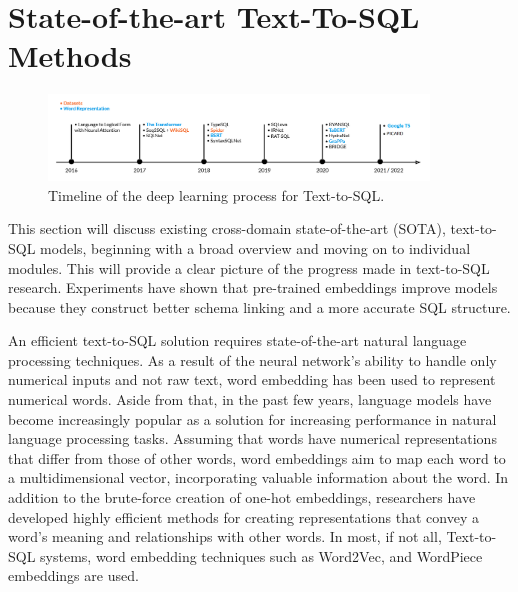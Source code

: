 \section{State-of-the-art Text-To-SQL Methods}

\begin{figure}[htb]
  \centering
  \includegraphics[width=0.9\textwidth]{pics/Timeline.png}
  \caption{Timeline of the deep learning process for Text-to-SQL.}
  \label{fig:timeline}
\end{figure}

This section will discuss existing cross-domain state-of-the-art (SOTA), text-to-SQL models, beginning with a broad overview and moving on to individual modules. This will provide a clear picture of the progress made in text-to-SQL research. Experiments have shown that pre-trained embeddings improve models because they construct better schema linking and a more accurate SQL structure.

An efficient text-to-SQL solution requires state-of-the-art natural language processing techniques.
As a result of the neural network's ability to handle only numerical inputs and not raw text, word embedding has been used to represent numerical words.
Aside from that, in the past few years, language models have become increasingly popular as a solution for increasing performance in natural language processing tasks.
Assuming that words have numerical representations that differ from those of other words, word embeddings aim to map each word to a multidimensional vector, incorporating valuable information about the word. In addition to the brute-force creation of one-hot embeddings, researchers have developed highly efficient methods for creating representations that convey a word's meaning and relationships with other words. In most, if not all, Text-to-SQL systems, word embedding techniques such as Word2Vec\cite{DBLP:journals/corr/Rong14}, and WordPiece embeddings\cite{DBLP:journals/corr/WuSCLNMKCGMKSJL16} are used.

